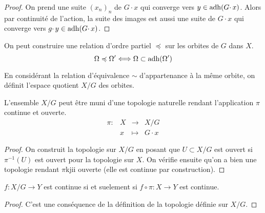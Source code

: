 \begin{proof}
 On prend une suite $(x_n)_n$ de $G\cdotp x$ qui converge vers $y\in
\operatorname{adh}(G\cdotp x)$. Alors par continuité de l'action, la suite des images est
aussi une suite de $G\cdotp x$ qui converge vers $g\cdotp y \in \operatorname{adh} (G\cdotp
x)$.
\end{proof}

\begin{coro}
 
On peut construire une relation d'ordre partiel $\preccurlyeq$ sur les orbites
de $G$ dans $X$.
\begin{displaymath}
 \Omega \preccurlyeq \Omega' \Longleftrightarrow \Omega \subset \operatorname{adh}(\Omega')
\end{displaymath}
\end{coro}

\begin{defi}
 
En considérant la relation d'équivalence $\sim$ d'appartenance à la même
orbite, on définit l'espace quotient $X/G$ des orbites.
\end{defi}

\begin{prop}
 
L'ensemble $X/G$ peut être muni d'une topologie naturelle rendant l'application
$\pi$ continue et ouverte.
\begin{displaymath} \begin{array}{rrcl}
 \pi :&X &\longrightarrow& X/G \\
      &x &\longmapsto    & G\cdotp x
\end{array} \end{displaymath}
\end{prop}

\begin{proof}
 On construit la topologie sur $X/G$ en posant que $U\subset X/G$ est ouvert si
$\pi^{-1}(U)$ est ouvert pour la topologie sur $X$. On vérifie ensuite qu'on a
bien une topologie rendant $\pi$kjii ouverte (elle est continue par
construction).
\end{proof}

\begin{prop}
 $f : X/G \rightarrow Y$ est continue si et suelement si $f\circ
\pi:X\rightarrow Y$ est continue.
\end{prop}

\begin{proof}
 C'est une conséquence de la définition de la topologie définie sur $X/G$.
\end{proof}


